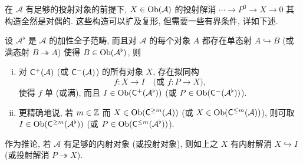 在 $\mathcal{A}$ 有足够的投射对象的前提下, $X \in \operatorname{Ob}(\mathcal{A})$ 的投射解消 $\cdots \to P^0 \to X \to 0$ 其构造全然是对偶的. 这些构造可以扩及复形, 但需要一些有界条件, 详如下述.

\begin{theorem}\label{prop:resolution-existence}
	设 $\mathcal{A}^\flat$ 是 $\mathcal{A}$ 的加性全子范畴, 而且对 $\mathcal{A}$ 的每个对象 $A$ 都存在单态射 $A \hookrightarrow B$ (或满态射 $B \twoheadrightarrow A$) 使得 $B \in \operatorname{Ob}(\mathcal{A}^\flat)$, 则
	\begin{enumerate}[(i)]
		\item 对 $\mathsf{C}^+(\mathcal{A})$ (或 $\mathsf{C}^-(\mathcal{A})$) 的所有对象 $X$, 存在拟同构
		\[ f: X \to I \quad \text{(或 $f: P \to X$)}, \]
		使得 $f$ 单 (或满), 而且 $I \in \operatorname{Ob}(\mathsf{C}^+(\mathcal{A}^\flat))$ (或 $P \in \operatorname{Ob}(\mathsf{C}^-(\mathcal{A}^\flat))$).
		\item 更精确地说, 若 $m \in \mathbb{Z}$ 而 $X \in \operatorname{Ob}(\mathsf{C}^{\geq m}(\mathcal{A}))$ (或 $X \in \operatorname{Ob}(\mathsf{C}^{\leq m}(\mathcal{A}))$), 则可取 $I \in \operatorname{Ob}(\mathsf{C}^{\geq m}(\mathcal{A}^\flat))$ (或 $P \in \operatorname{Ob}(\mathsf{C}^{\leq m}(\mathcal{A}^\flat))$).
	\end{enumerate}

	作为推论, 若 $\mathcal{A}$ 有足够的内射对象 (或投射对象), 则如上之 $X$ 有内射解消 $X \hookrightarrow I$ (或投射解消 $P \twoheadrightarrow X$).
\end{theorem}

